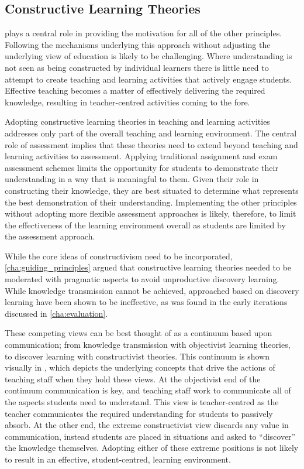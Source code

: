 \subsection{Constructive Learning Theories} %
\label{sub:constructive_learning_theories}

 plays a central role in providing the motivation for all of the other principles. Following the mechanisms underlying this approach without adjusting the underlying view of education is likely to be challenging. Where understanding is not seen as being constructed by individual learners there is little need to attempt to create teaching and learning activities that actively engage students. Effective teaching becomes a matter of effectively delivering the required knowledge, resulting in teacher-centred activities coming to the fore. 

Adopting constructive learning theories in teaching and learning activities addresses only part of the overall teaching and learning environment. The central role of assessment implies that these theories need to extend beyond teaching and learning activities to assessment. Applying traditional assignment and exam assessment schemes limits the opportunity for students to demonstrate their understanding in a way that is meaningful to them. Given their role in constructing their knowledge, they are best situated to determine what represents the best demonstration of their understanding. Implementing the other principles without adopting more flexible assessment approaches is likely, therefore, to limit the effectiveness of the learning environment overall as students are limited by the assessment approach.

While the core ideas of constructivism need to be incorporated, \cref{cha:guiding_principles} argued that constructive learning theories needed to be moderated with pragmatic aspects to avoid unproductive discovery learning. While knowledge transmission cannot be achieved, approached based on discovery learning have been shown to be ineffective, as was found in the early iterations discussed in \cref{cha:evaluation}. 

These competing views can be best thought of as a continuum based upon communication; from knowledge transmission with objectivist learning theories, to discover learning with constructivist theories. This continuum is shown visually in , which depicts the underlying concepts that drive the actions of teaching staff when they hold these views. At the objectivist end of the continuum communication is key, and teaching staff work to communicate all of the aspects students need to understand. This view is teacher-centred as the teacher communicates the required understanding for students to passively absorb. At the other end, the extreme constructivist view discards any value in communication, instead students are placed in situations and asked to ``discover'' the knowledge themselves. Adopting either of these extreme positions is not likely to result in an effective, student-centred, learning environment.

